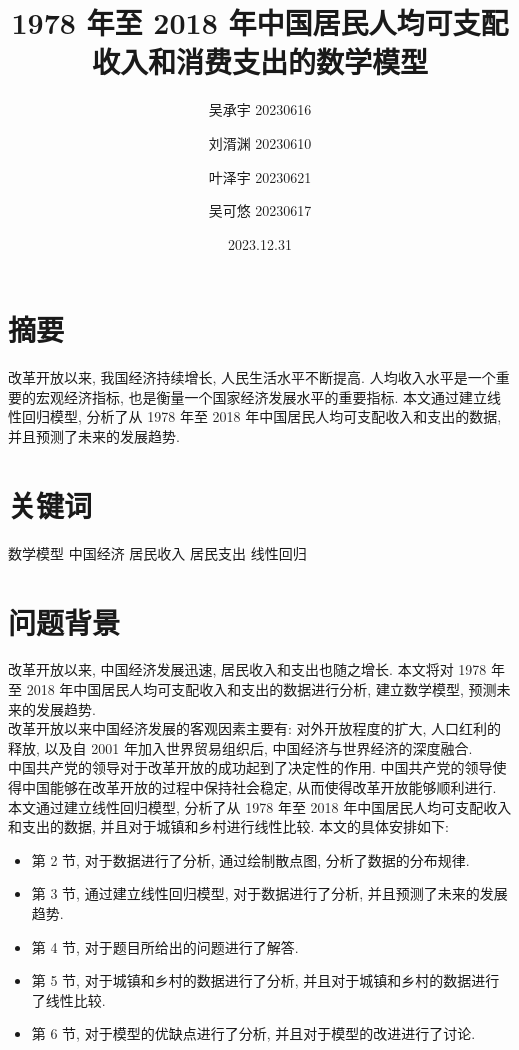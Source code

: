 \documentclass{article}
\title{1978 年至 2018 年中国居民人均可支配收入和消费支出的数学模型}
\author{吴承宇 20230616 \and 刘湑渊 20230610 \and 叶泽宇 20230621 \and 吴可悠 20230617}
\date{2023.12.31}
\begin{document}
\maketitle
\section*{摘要}
\begin{mdframed}
\fangsong
改革开放以来, 我国经济持续增长, 人民生活水平不断提高. 人均收入水平是一个重要的宏观经济指标, 也是衡量一个国家经济发展水平的重要指标. 本文通过建立线性回归模型, 分析了从 1978 年至 2018 年中国居民人均可支配收入和支出的数据, 并且预测了未来的发展趋势.\\
\end{mdframed}
\section*{关键词}
\begin{mdframed}
\fangsong
数学模型 \quad 中国经济 \quad 居民收入 \quad 居民支出 \quad 线性回归
\end{mdframed}

\section{问题背景}
改革开放以来, 中国经济发展迅速, 居民收入和支出也随之增长. 本文将对 1978 年至 2018 年中国居民人均可支配收入和支出的数据进行分析, 建立数学模型, 预测未来的发展趋势.\\
\indent 改革开放以来中国经济发展的客观因素主要有: 对外开放程度的扩大, 人口红利的释放, 以及自 2001 年加入世界贸易组织后, 中国经济与世界经济的深度融合.\\
\indent 中国共产党的领导对于改革开放的成功起到了决定性的作用. 中国共产党的领导使得中国能够在改革开放的过程中保持社会稳定, 从而使得改革开放能够顺利进行.\\
\indent 本文通过建立线性回归模型, 分析了从 1978 年至 2018 年中国居民人均可支配收入和支出的数据, 并且对于城镇和乡村进行线性比较. 本文的具体安排如下:
\begin{itemize}
    \item 第 2 节, 对于数据进行了分析, 通过绘制散点图, 分析了数据的分布规律.
    \item 第 3 节, 通过建立线性回归模型, 对于数据进行了分析, 并且预测了未来的发展趋势.
    \item 第 4 节, 对于题目所给出的问题进行了解答.
    \item 第 5 节, 对于城镇和乡村的数据进行了分析, 并且对于城镇和乡村的数据进行了线性比较.
    \item 第 6 节, 对于模型的优缺点进行了分析, 并且对于模型的改进进行了讨论.
\end{itemize}
\end{document}
